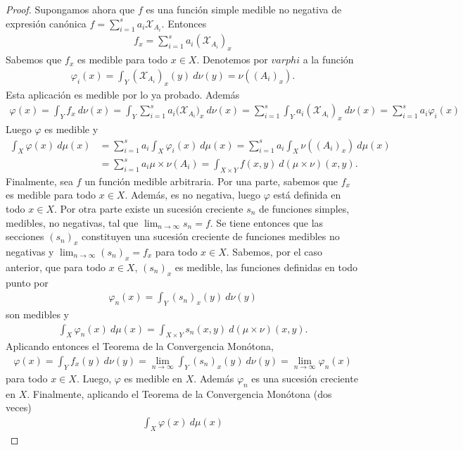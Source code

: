 \begin{proof}
    Supongamos ahora que $f$ es una función simple medible no negativa de expresión canónica $f = \sum_{i=1}^{s}{a_i\mathcal{X}_{A_i}}$. Entonces
    \begin{align*}
        f_x = \sum_{i=1}^{s}{a_i(\mathcal{X}_{A_i})_x}
    \end{align*}
    Sabemos que $f_x$ es medible para todo $x \in X$. Denotemos por $varphi$ a la función
    \begin{align*}
        \varphi_i(x) = \int_{Y}{(\mathcal{X}_{A_i})_x(y) \ d\nu(y)} = \nu((A_i)_x).
    \end{align*}
    Esta aplicación es medible por lo ya probado. Además
    \begin{align*}
        \varphi(x) = \int_{Y}{f_x \ d\nu(x)} = \int_{Y}{\sum_{i=1}^{s}{a_i(\mathcal{X}_{A_i}})_x} \ d\nu(x) = \sum_{i=1}^{s}{\int_{Y}{a_i(\mathcal{X}_{A_i})_x} \ d\nu(x)} = \sum_{i=1}^{s}{a_i\varphi_i(x)}
    \end{align*}
    Luego $\varphi$ es medible y
    \begin{align*}
        \int_{X}{\varphi(x) \ d\mu(x)} & = \sum_{i=1}^{s}{a_i\int_{X}{\varphi_i(x) \ d\mu(x)}} = \sum_{i=1}^{s}{a_i\int_{X}{\nu((A_i)_x) \ d\mu(x)}} \\
                                       & = \sum_{i=1}^{s}{a_i \mu \times \nu (A_i)} = \int_{X \times Y}{f(x,y) \ d(\mu \times \nu)(x,y)}.
    \end{align*}
    Finalmente, sea $f$ un función medible arbitraria. Por una parte, sabemos que $f_x$ es medible para todo $x \in X$. Además, es no negativa, luego $\varphi$ está definida en todo $x \in X$. Por otra parte existe un sucesión creciente $s_n$ de funciones simples, medibles, no negativas, tal que $\lim_{n \to \infty}{s_n} = f$. Se tiene entonces que las secciones $(s_n)_x$ constituyen una sucesión creciente de funciones medibles no negativas y $\lim_{n \to \infty}{(s_n)_x} = f_x$ para todo $x \in X$. Sabemos, por el caso anterior, que para todo $x \in X$, $(s_n)_x$ es medible, las funciones definidas en todo punto por
    \begin{align*}
        \varphi_n(x) = \int_{Y}{(s_n)_x(y) \ d\nu(y)}
    \end{align*}
    son medibles y
    \begin{align*}
        \int_{X}{\varphi_n(x) \ d\mu(x)} = \int_{X \times Y}{s_n(x,y) \ d(\mu \times \nu)(x,y)}.
    \end{align*}
    Aplicando entonces el Teorema de la Convergencia Monótona,
    \begin{align*}
        \varphi(x) = \int_{Y}{f_x(y) \ d\nu(y)} = \lim_{n \to \infty}{\int_{Y}{(s_n)_x(y) \ d\nu(y)}} = \lim_{n \to \infty}{\varphi_n(x)}
    \end{align*}
    para todo $x \in X$. Luego, $\varphi$ es medible en $X$. Además $\varphi_n$ es una sucesión creciente en $X$. Finalmente, aplicando el Teorema de la Convergencia Monótona (dos veces)
    \begin{align*}
        \int_{X}{\varphi(x) \ d\mu(x)}
    \end{align*}
\end{proof}

